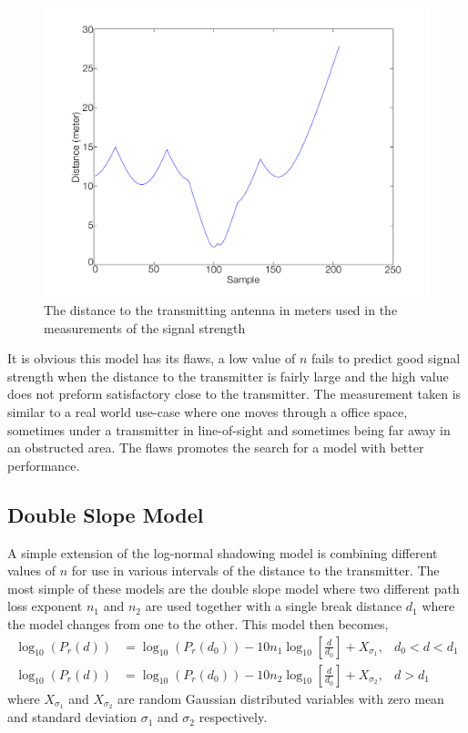 \documentclass{LTHthesis}
\begin{document}
%
\begin{figure}[!hbt]

\includegraphics[width=1\textwidth ]{images/signal_model/dist_trans}
\caption{The distance to the transmitting antenna in meters used in the measurements of the signal strength}\label{dist_trans}
\end{figure}

It is obvious this model has its flaws, a low value of $n$ fails to predict good signal strength when the distance to the transmitter is fairly large and the high value does not preform satisfactory close to the transmitter. The measurement taken is similar to a real world use-case where one moves through a office space, sometimes under a transmitter in line-of-sight and sometimes being far away in an obstructed area. The flaws promotes the search for a model with better performance.
%
\subsection{Double Slope Model}
%
A simple extension of the log-normal shadowing model is combining different values of $n$ for use in various intervals of the distance to the transmitter. The most simple of these models are the double slope model where two different path loss exponent $n_1$ and $n_2$ are used together with a single break distance $d_1$ where the model changes from one to the other. This model then becomes,
\begin{subequations}
\begin{align}
\log_{10}({P_r(d)})&=\log_{10}({P_r(d_0)})-10n_1\log_{10}\left[{\frac{d}{d_0}}\right] + X_{\sigma_1}, & d_0<d<d_1\\
\log_{10}({P_r(d)})&=\log_{10}({P_r(d_0)})-10n_2\log_{10}\left[{\frac{d}{d_0}}\right] + X_{\sigma_2}, & d>d_1
\end{align}
\end{subequations} 
where $X_{\sigma_1}$ and $X_{\sigma_2}$ are random Gaussian distributed variables with zero mean and standard deviation $\sigma_1$ and $\sigma_2$ respectively.
 
\end{document}
